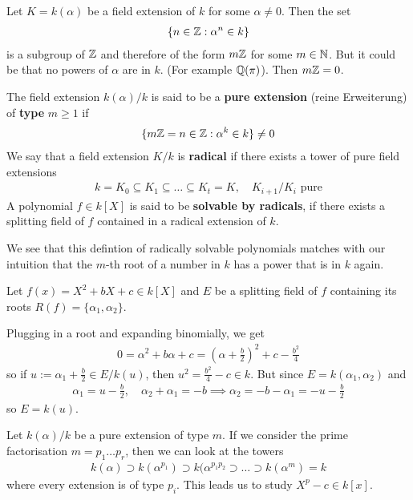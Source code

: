 Let $K = k(\alpha)$ be a field extension of $k$ for some $\alpha \neq0$. 
Then the set
\begin{align*}
  \{n \in \mathbb{Z}: \alpha^{n} \in k\}
\end{align*}
is a subgroup of $\mathbb{Z}$ and therefore of the form $m\mathbb{Z}$ for some $m \in \mathbb{N}$.
But it could be that no powers of $\alpha$ are in $k$. 
(For example $\mathbb{Q}(\pi)$).
Then $m\mathbb{Z} = 0$.

\begin{dfn}[]
  The field extension $k(\alpha)/k$ is said to be a \textbf{pure extension} (reine Erweiterung) of \textbf{type} $m \geq 1$ if
  \begin{align*}
    \{
    m\mathbb{Z} = n \in \mathbb{Z}: \alpha^{k} \in k
    \} \neq 0
  \end{align*}
  We say that a field extension $K/k$ is \textbf{radical} if there exists a tower of pure field extensions
  \begin{align*}
    k = K_0 \subseteq K_1 \subseteq \ldots \subseteq K_t = K,
    \quad K_{i+1}/K_i \text{ pure}
  \end{align*}
  A polynomial $f \in k[X]$ is said to be \textbf{solvable by radicals}, 
  if there exists a splitting field of $f$ contained in a radical extension of $k$.
\end{dfn}

We see that this defintion of radically solvable polynomials matches with our intuition that the $m$-th root of a number in $k$ has a power that is in $k$ again.
\begin{ex}[]
  Let $f(x) =X^{2}+ b X + c \in k[X]$ and $E$ be a splitting field of $f$ containing its roots $R(f) = \{\alpha_1,\alpha_2\}$.

  Plugging in a root and expanding binomially, we get
  \begin{align*}
    0 = \alpha^{2} + b \alpha + c = \left(
      \alpha + \tfrac{b}{2}
    \right)^{2} + c - \tfrac{b^{2}}{4}
  \end{align*}
so if $u := \alpha_1 + \tfrac{b}{2} \in E/k(u)$, then $u^{2} = \tfrac{b^{2}}{4}- c \in k$.
But since $E = k(\alpha_1,\alpha_2)$ and
\begin{align*}
  \alpha_1 = u - \tfrac{b}{2}, \quad \alpha_2 + \alpha_1 = -b \implies \alpha_2 = -b - \alpha_1 = -u - \tfrac{b}{2}
\end{align*}
so $E = k(u)$.
\end{ex}


Let $k(\alpha)/k$ be a pure extension of type $m$. 
If we consider the prime factorisation $m = p_1 \ldots p_r$, then we can look at the towers
\begin{align*}
  k(\alpha) \supset k(\alpha^{p_1}) \supset k(\alpha^{p_1p_2} \supset \ldots \supset k(\alpha^{m}) = k
\end{align*}
where every extension is of type $p_i$.
This leads us to study $X^{p} - c \in k[x]$.

